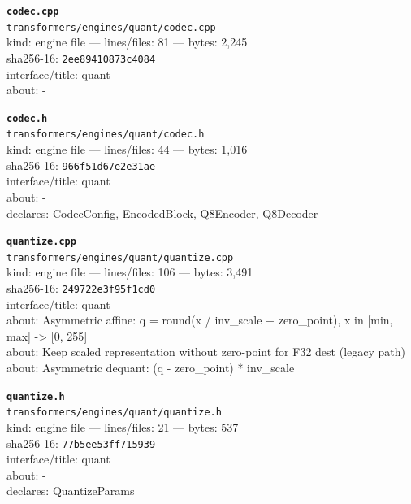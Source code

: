 \noindent\textbf{\texttt{codec.cpp}}\\
\texttt{transformers/engines/quant/codec.cpp}\\
kind: engine file --- lines/files: 81 --- bytes: 2,245\\
sha256-16: \texttt{2ee89410873c4084}\\
interface/title: quant\\
about: -\\
\vspace*{6.0pt}

\noindent\textbf{\texttt{codec.h}}\\
\texttt{transformers/engines/quant/codec.h}\\
kind: engine file --- lines/files: 44 --- bytes: 1,016\\
sha256-16: \texttt{966f51d67e2e31ae}\\
interface/title: quant\\
about: -\\
declares: CodecConfig, EncodedBlock, Q8Encoder, Q8Decoder\\
\vspace*{6.0pt}

\noindent\textbf{\texttt{quantize.cpp}}\\
\texttt{transformers/engines/quant/quantize.cpp}\\
kind: engine file --- lines/files: 106 --- bytes: 3,491\\
sha256-16: \texttt{249722e3f95f1cd0}\\
interface/title: quant\\
about: Asymmetric affine: q = round(x / inv\_scale + zero\_point), x in [min, max] -> [0, 255]\\
about: Keep scaled representation without zero-point for F32 dest (legacy path)\\
about: Asymmetric dequant: (q - zero\_point) * inv\_scale\\
\vspace*{6.0pt}

\noindent\textbf{\texttt{quantize.h}}\\
\texttt{transformers/engines/quant/quantize.h}\\
kind: engine file --- lines/files: 21 --- bytes: 537\\
sha256-16: \texttt{77b5ee53ff715939}\\
interface/title: quant\\
about: -\\
declares: QuantizeParams\\
\vspace*{6.0pt}
\newpage

